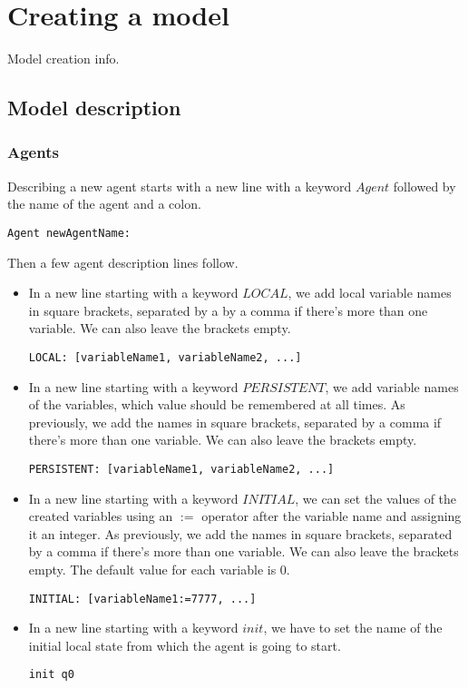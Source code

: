 \documentclass[12pt]{article}
\begin{document}
\section{Creating a model}
Model creation info.
\subsection{Model description}

\subsubsection{Agents}
Describing a new agent starts with a new line with a keyword $Agent$ followed by the name of the agent and a colon.
\begin{lstlisting}[title={Creating an agent with a name "newAgentName".}]
  Agent newAgentName:
\end{lstlisting}
Then a few agent description lines follow.
\begin{itemize}
  \item In a new line starting with a keyword $LOCAL$, we add local variable names in square brackets, separated by a by a comma if there's more than one variable. We can also leave the brackets empty.
  \begin{lstlisting}[title={Creating local variables named "variableName1", "variableName2".}]
    LOCAL: [variableName1, variableName2, ...]
  \end{lstlisting}
  \item In a new line starting with a keyword $PERSISTENT$, we add variable names of the variables, which value should be remembered at all times. As previously, we add the names in square brackets, separated by a comma if there's more than one variable. We can also leave the brackets empty.
  \begin{lstlisting}[title={Making local variables named "variableName1", "variableName2" and so on, persistent.}]
    PERSISTENT: [variableName1, variableName2, ...]
  \end{lstlisting}
  \item In a new line starting with a keyword $INITIAL$, we can set the values of the created variables using an $:=$ operator after the variable name and assigning it an integer. As previously, we add the names in square brackets, separated by a comma if there's more than one variable. We can also leave the brackets empty. The default value for each variable is 0.
  \begin{lstlisting}[title={Setting a value 7777 to the "variableName1" variable and so on.}]
    INITIAL: [variableName1:=7777, ...]
  \end{lstlisting}
  \item In a new line starting with a keyword $init$, we have to set the name of the initial local state from which the agent is going to start.
  \begin{lstlisting}[title={Setting the "q0" as the initial state in the local model.}]
    init q0
  \end{lstlisting}
\end{itemize}
\end{document}
